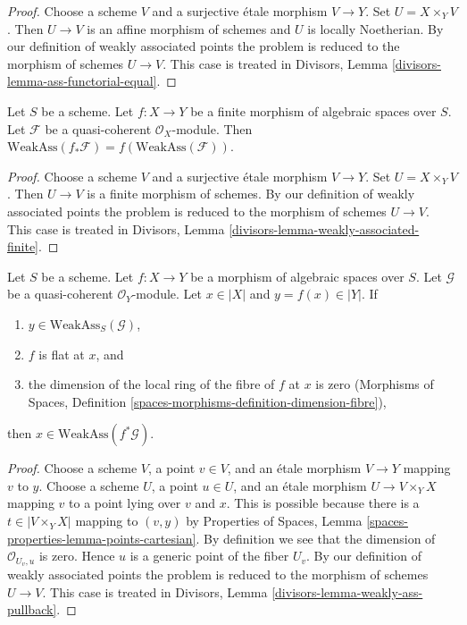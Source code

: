 \begin{proof}
Choose a scheme $V$ and a surjective \'etale morphism $V \to Y$.
Set $U = X \times_Y V$. Then $U \to V$ is an affine morphism
of schemes and $U$ is locally Noetherian.
By our definition of weakly associated points
the problem is reduced to the morphism of schemes $U \to V$. This case is
treated in Divisors, Lemma \ref{divisors-lemma-ass-functorial-equal}.
\end{proof}

\begin{lemma}
\label{lemma-weakly-associated-finite}
Let $S$ be a scheme.
Let $f : X \to Y$ be a finite morphism of algebraic spaces over $S$.
Let $\mathcal{F}$ be a quasi-coherent $\mathcal{O}_X$-module.
Then $\text{WeakAss}(f_*\mathcal{F}) = f(\text{WeakAss}(\mathcal{F}))$.
\end{lemma}

\begin{proof}
Choose a scheme $V$ and a surjective \'etale morphism $V \to Y$.
Set $U = X \times_Y V$. Then $U \to V$ is a finite morphism
of schemes. By our definition of weakly associated points
the problem is reduced to the morphism of schemes $U \to V$. This case is
treated in Divisors, Lemma \ref{divisors-lemma-weakly-associated-finite}.
\end{proof}

\begin{lemma}
\label{lemma-weakly-ass-pullback}
Let $S$ be a scheme. Let $f : X \to Y$ be a morphism of algebraic spaces
over $S$. Let $\mathcal{G}$ be a quasi-coherent $\mathcal{O}_Y$-module.
Let $x \in |X|$ and $y = f(x) \in |Y|$. If
\begin{enumerate}
\item $y \in \text{WeakAss}_S(\mathcal{G})$,
\item $f$ is flat at $x$, and
\item the dimension of the local ring of the fibre of $f$ at $x$
is zero (Morphisms of Spaces, Definition
\ref{spaces-morphisms-definition-dimension-fibre}),
\end{enumerate}
then $x \in \text{WeakAss}(f^*\mathcal{G})$.
\end{lemma}

\begin{proof}
Choose a scheme $V$, a point $v \in V$, and an \'etale morphism $V \to Y$
mapping $v$ to $y$. Choose a scheme $U$, a point $u \in U$, and an
\'etale morphism $U \to V \times_Y X$ mapping $v$ to a point lying over
$v$ and $x$. This is possible because there is a $t \in |V \times_Y X|$
mapping to $(v, y)$ by Properties of Spaces, Lemma
\ref{spaces-properties-lemma-points-cartesian}.
By definition we see that the dimension of $\mathcal{O}_{U_v, u}$ is zero.
Hence $u$ is a generic point of the fiber $U_v$.
By our definition of weakly associated points
the problem is reduced to the morphism of schemes $U \to V$.
This case is treated in
Divisors, Lemma \ref{divisors-lemma-weakly-ass-pullback}.
\end{proof}

